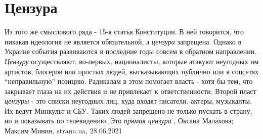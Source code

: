  
 
 
 
 
\chapter{Цензура}
\label{sec:slova.cenzura}

Из того же смыслового ряда - 15-я статья Конституции. В ней говорится, что
никакая идеология не является обязательной, а \emph{цензура} запрещена.
Однако в Украине события развиваются в последние годы совсем в обратном
направлении.
\emph{Цензуру} осуществляют, во-первых, националисты, которые атакуют неугодных им
артистов, блогеров или простых людей, высказывающих публично или в соцсетях
\enquote{неправильную} позицию. Радикалам в этом помогает власть - хотя бы тем, что
закрывает глаза на их действия и не привлекает к ответственности.
Второй пласт \emph{цензуры} - это списки неугодных лиц, куда входят писатели, актеры,
музыканты. Их ведут Минкульт и СБУ. Таких людей запрещено не только пускать в
страну, но и показывать по телевидению. Это \emph{прямая цензура}
, 
Оксана Малахова; Максим Минин, strana.ua, 28.06.2021

